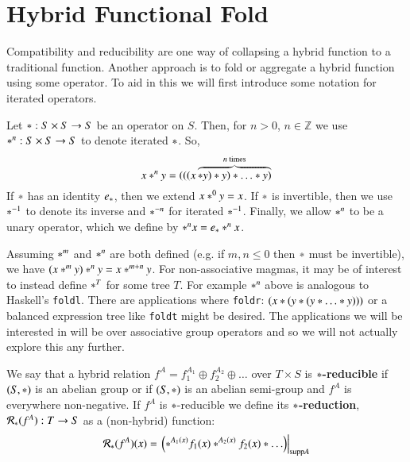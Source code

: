 \section{Hybrid Functional Fold}


Compatibility and reducibility are one way of collapsing a hybrid function to a traditional function.
Another approach is to fold or aggregate a hybrid function using some operator.
To aid in this we will first introduce some notation for iterated operators.
\begin{definition}
	Let $* : S \times S \to S$ be an operator on $S$.
	Then, for $n > 0$, $n \in \mathbb{Z}$ we use $*^n:S \times S \to S$ to denote iterated $*$.
	So,
	\begin{equation}
		x *^n y = (((x \overbrace{* y) * y) * \ldots * y)}^{n \text{ times}}
	\end{equation}
	If $*$ has an identity $e_*$, then we extend $x *^0 y = x$.
	If $*$ is invertible, then we use $*^{-1}$ to denote its inverse and $*^{-n}$ for iterated $*^{-1}$.
	Finally, we allow $*^n$ to be a unary operator, which we define by $*^n x = e_* *^n x$.
\end{definition}


Assuming $*^m$ and $*^n$ are both defined (e.g. if $m,n \leq 0$ then $*$ must be invertible),
we have $ ( x *^m y ) *^n y = x *^{m+n} y$.
For non-associative magmas, it may be of interest to instead define $*^T$ for some tree $T$. 
For example $*^n$ above is analogous to Haskell's \texttt{foldl}.
There are applications where \texttt{foldr}: $(x * ( y * ( y * \ldots * y)))$ or a balanced expression tree like \texttt{foldt} might be desired.
The applications we will be interested in will be over associative group operators and so we will not actually 
explore this any further.

\begin{definition}
	We say that a hybrid relation $f^A = f_1^{A_1} \oplus f_2^{A_2} \oplus \ldots$ over $T \times S$ 
	is $*$\textbf{-reducible} if $(S, *)$ is an abelian group 
	or if $(S, *)$ is an abelian semi-group and $f^A$ is everywhere non-negative.
	If $f^A$ is $*$-reducible we define its $*$\textbf{-reduction}, $\mathcal{R}_*(f^A) :  T \to S$ 
	as a (non-hybrid) function:
	\begin{equation}
		\mathcal{R}_* (f^A)(x) = \left.\left(*^{A_1(x)} f_1(x) *^{A_2(x)} f_2(x) * \ldots \right)\right|_{\text{supp} A}
	\end{equation}
\end{definition}


